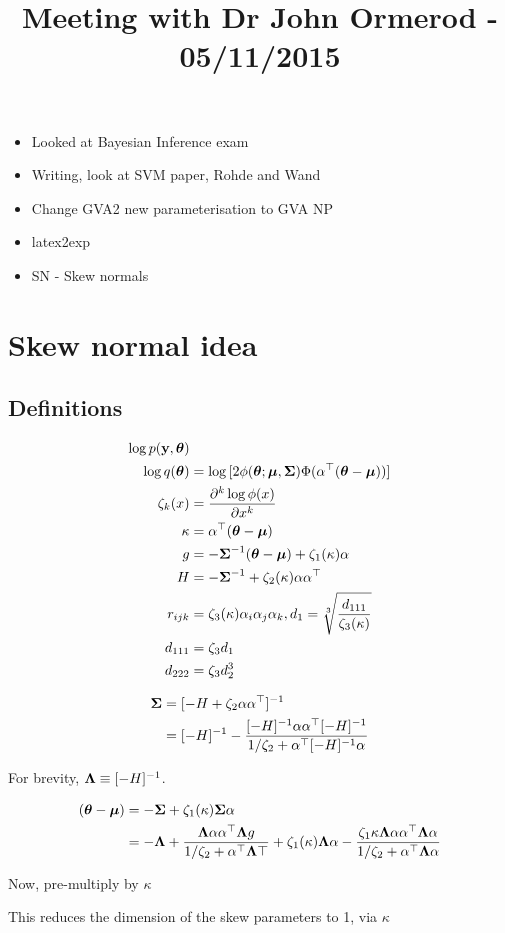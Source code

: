 \documentclass{amsart}
\title{Meeting with Dr John Ormerod - 05/11/2015}
\begin{document}
\maketitle

\begin{itemize}
	\item Looked at Bayesian Inference exam
	\item Writing, look at SVM paper, Rohde and Wand
	\item Change GVA2 new parameterisation to GVA NP
	\item latex2exp
	\item SN - Skew normals
\end{itemize}

\section{Skew normal idea}

\subsection{Definitions}

\begin{align*}
\log p({\bf y}, {\boldsymbol \theta}) & \\
\log q({\boldsymbol \theta}) &= \log{[2 \phi({\boldsymbol\theta};{\boldsymbol\mu}, {\boldsymbol\Sigma}) \Phi(\alpha^\top({\boldsymbol\theta}- {\boldsymbol\mu}))]} \\
\zeta_k(x) & = \frac{\partial^k \log \phi(x)}{\partial x^k} \\
\kappa &= \alpha^\top({\boldsymbol \theta} - {\boldsymbol \mu}) \\
g & = -{\boldsymbol \Sigma}^{-1} ({\boldsymbol \theta} - {\boldsymbol \mu}) + \zeta_1(\kappa) \alpha \\
H & = -{\boldsymbol \Sigma}^{-1} + \zeta_2(\kappa) \alpha \alpha^\top \\
r_{ijk} & = \zeta_3(\kappa) \alpha_i \alpha_j \alpha_k, d_1 = \sqrt[3]{\frac{d_{111}}{\zeta_3(\kappa)}} \\
d_{111} &= \zeta_3 d_1 \\\
d_{222} &= \zeta_3 d_2^3
\end{align*}

\begin{align*}
{\boldsymbol\Sigma} &= [-H + \zeta_2 \alpha \alpha^\top]^{-1} \\
&= [-H]^{-1} - \frac{[-H]^{-1} \alpha \alpha^\top [-H]^{-1}}{1/\zeta_2 + \alpha^\top[-H]^{-1}\alpha} \\
\end{align*}

For brevity, ${\boldsymbol \Lambda} \equiv [-H]^{-1}$.

\begin{align*}
({\boldsymbol \theta} - {\boldsymbol \mu}) &= -{\boldsymbol \Sigma} + \zeta_1(\kappa) {\boldsymbol \Sigma} \alpha \\
&=-{\boldsymbol \Lambda} + \frac{{\boldsymbol \Lambda} \alpha \alpha^\top {\boldsymbol\Lambda} g}{1/\zeta_2 + \alpha^\top {\boldsymbol\Lambda} \top}
	+ \zeta_1(\kappa) {\boldsymbol \Lambda} \alpha
	- \frac{\zeta_1{\kappa} {\boldsymbol \Lambda} \alpha \alpha^\top {\boldsymbol\Lambda} \alpha}{1/\zeta_2 + \alpha^\top{\boldsymbol\Lambda}\alpha}
\end{align*}

Now, pre-multiply by $\kappa$


This reduces the dimension of the skew parameters to 1, via $\kappa$
\end{document}
